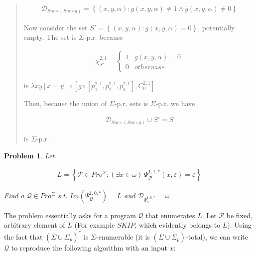 \documentclass[a4paper, 12pt]{article}
\newtheorem{problem}{Problem}
\newtheorem{problem}{Problem}
\begin{document}
\begin{quote}
    \begin{align*}
        \mathcal{D}_{Suc \circ (Suc \circ g)} = \left\{ (x, y, \alpha) : g(x, y,
        \alpha) \neq 1 \land g(x, y, \alpha) \neq 0 \right\} 
    \end{align*}


Now consider the set $S' = \left\{ (x, y, \alpha) : g(x, y, \alpha) = 0 \right\}
$, potentially empty. The set is $\Sigma$-p.r. because

\begin{align*}
    \chi_{S'}^{2, 1} = \begin{cases}
        1 & g(x, y, \alpha) = 0 \\ 
        0 & otherwise
    \end{cases}
\end{align*}

is $\lambda xy \left[ x = y  \right] \circ \left[ g \circ \left[ p_1^{2, 1},
p_2^{2, 1}, p_3^{2, 1} \right], C_0^{2, 1}  \right] $

Then, because the union of $\Sigma$-p.r. sets is $\Sigma$-p.r. we have 

\begin{align*}
    \mathcal{D}_{Suc \circ (Suc \circ g)} \cup S' = S
\end{align*}

is $\Sigma$-p.r. 

\end{quote}
\normalsize

\pagebreak

\begin{problem}
    Let

    \begin{align*}
    L = \left\{ \mathcal{P} \in Pro^{\Sigma} : \left( \exists x \in \omega \right) ~
    \Psi_{\mathcal{P}}^{1, 1, *} (x, \varepsilon ) = \varepsilon \right\} 
    \end{align*}

    Find a $\mathcal{Q} \in Pro^{\Sigma}$ s.t. $Im(\Psi_{\mathcal{Q}}^{1, 0, *})
    = L$ and $\mathcal{D}_{\Psi_{\mathcal{Q}}^{1, 0, *}} = \omega$
\end{problem}

The problem essentially asks for a program $\mathcal{Q}$ that enumerates $L$.
Let $\mathcal{P}$ be fixed, arbitrary element of $L$ (For example $SKIP$,
 which
 evidently belongs to $L$). Using the fact that $(\Sigma \cup \Sigma_p)^{*}$ is
$\Sigma$-enumerable (it is $(\Sigma \cup \Sigma_p)$-total), we can write
$\mathcal{Q}$ to reproduce the following algorithm with an input $x$: 
\end{document}
